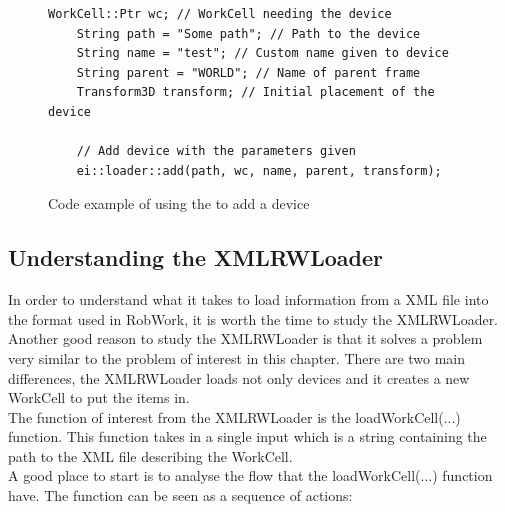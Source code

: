 \begin{figure}[h]
	\centering
	\lstset{language=C++} 
	\begin{lstlisting}[frame=single]
	WorkCell::Ptr wc; // WorkCell needing the device
	String path = "Some path"; // Path to the device
	String name = "test"; // Custom name given to device
	String parent = "WORLD"; // Name of parent frame
	Transform3D transform; // Initial placement of the device
	
	// Add device with the parameters given
	ei::loader::add(path, wc, name, parent, transform);
	\end{lstlisting}
	\caption{Code example of using the to add a device}
	\label{fig:UseCodeExampleLoader}
\end{figure}


\subsection{Understanding the XMLRWLoader}
\label{subsec:XMLRWLoader}
In order to understand what it takes to load information from a XML file into the format used in RobWork, it is worth the time to study the XMLRWLoader. Another good reason to study the XMLRWLoader is that it solves a problem very similar to the problem of interest in this chapter. There are two main differences, the XMLRWLoader loads not only devices and it creates a new WorkCell to put the items in.\\

The function of interest from the XMLRWLoader is the loadWorkCell(...) function. This function takes in a single input which is a string containing the path to the XML file describing the WorkCell.\\
A good place to start is to analyse the flow that the loadWorkCell(...) function have. The function can be seen as a sequence of actions:

